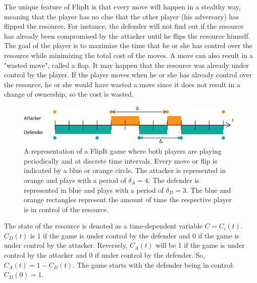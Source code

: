 The unique feature of FlipIt is that every move will happen in a stealthy way, meaning that the player has no clue that the other player (his adversary) has flipped the resource. For instance, the defender will not find out if the resource has already been compromised by the attacker until he flips the resource himself. The goal of the player is to maximize the time that he or she has control over the resource while minimizing the total cost of the moves. A move can also result in a "wasted move", called a flop. It may happen that the resource was already under control by the player. If the player moves when he or she has already control over the resource, he or she would have wasted a move since it does not result in a change of ownership, so the cost is wasted. \\


\begin{figure}[hbtp]
\centering
\includegraphics[scale=0.5]{../../doc/template/Images/DefFlipit}
\caption{A representation of a FlipIt game where both players are playing periodically and at discrete time intervals. Every move or flip is indicated by a blue or orange circle. The attacker is represented in orange and plays with a period of $\delta_{A}=4$. The defender is represented in blue and plays with a period of $\delta_{D}=3$. The blue and orange rectangles represent the amount of time the respective player is in control of the resource.}
\label{fig:FLipItDefault}
\end{figure}



The state of the resource is denoted as a time-dependent variable $C=C_{i}(t)$. 
$C_{D}(t)$ is 1 if the game is under control by the defender and 0 if the game is under control by the attacker. Reversely, $C_{A}(t)$ will be 1 if the game is under control by the attacker and 0 if under control by the defender. So, $C_{A}(t)= 1 - C_{D}(t)$.
The game starts with the defender being in control: $C_{D}(0)= 1$. \\



